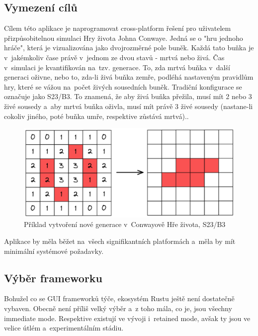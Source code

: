 \documentclass[a4paper, 12pt, twoside]{article} %
\begin{document}
	\subsection{Vymezení cílů}
		Cílem této aplikace je naprogramovat cross-platform řešení pro uživatelem přizpůsobitelnou simulaci Hry života Johna Conwaye. Jedná se o "hru jednoho hráče", která je vizualizována jako dvojrozměrné pole buněk. Každá tato buňka je v~jakémkoliv čase právě v~jednom ze dvou stavů - mrtvá nebo živá. Čas v~simulaci je kvantifikován na~tzv. generace. To, zda mrtvá buňka v~další generaci oživne, nebo to, zda-li živá buňka zemře, podléhá nastaveným pravidlům hry, které se vážou na~počet živých sousedních buněk. Tradiční konfigurace se označuje jako S23/B3. To znamená, že aby živá buňka přežila, musí mít 2 nebo 3 živé sousedy a~aby mrtvá buňka oživla, musí mít právě 3 živé sousedy (nastane-li cokoliv jiného, poté buňka umře, respektive zůstává mrtvá).\cite{conway}.
		\begin{center}
			\begin{figure}[H]
				\centering
				\includegraphics[width=.82\linewidth]{conway}
				\caption{Příklad vytvoření nové generace v~Conwayově Hře života, S23/B3}
				\label{fig:conway}
			\end{figure}
		\end{center}
	
		Aplikace by měla běžet na~všech signifikantních platformách a~měla by mít minimální systémové požadavky.
	
	\subsection{Výběr frameworku}
		Bohužel co se GUI frameworků týče, ekosystém Rustu ještě není dostatečně vybaven. Obecně není příliš velký výběr a~z toho mála, co je, jsou všechny immediate mode. Respektive existují ve vývoji i~retained mode, avšak ty jsou ve velice útlém a~experimentálním stádiu.
\end{document}
